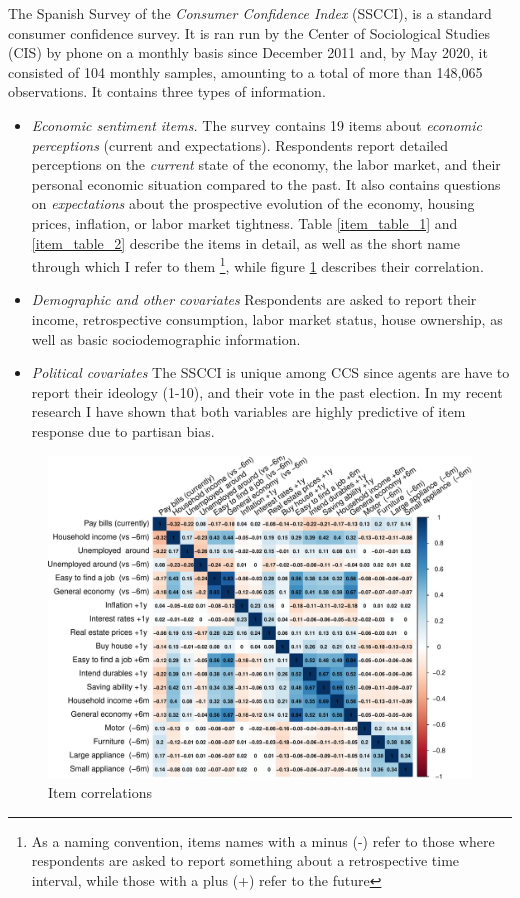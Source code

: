 \documentclass[12pt]{article}
\begin{document}
The Spanish Survey of the \textit{Consumer Confidence Index} (SSCCI), is a standard consumer confidence survey. It is ran  run by the Center of Sociological Studies (CIS) by phone on a monthly basis since December 2011 and, by May 2020, it consisted of 104 monthly samples, amounting to a total of more than 148,065 observations. It contains three types of information.


\begin{itemize}
\item \emph{Economic sentiment items. } The survey contains 19 items about \textit{economic perceptions} (current and expectations). Respondents report detailed perceptions on the \textit{current} state of the economy, the labor market, and their personal economic situation compared to the past. It also contains questions on \textit{expectations} about the prospective evolution of the economy, housing prices, inflation, or labor market tightness. Table \ref{item_table_1} and \ref{item_table_2} describe the items in detail,  as well as the short name through which I refer to them \footnote{As a naming convention, items names with a minus (-) refer to those where respondents are asked to report something about a retrospective time interval, while those with a plus (+) refer to the future}, while figure \ref{icc_item_correlation} describes their correlation.
\item \emph{Demographic and other covariates} Respondents are asked to report  their income, retrospective consumption, labor market status, house ownership, as well as basic sociodemographic information. 
\item \emph{Political covariates} The SSCCI is unique among CCS since agents are have to report their ideology (1-10), and their vote in the past election. In my recent research I have shown that both variables are highly predictive of item response due to partisan bias. 
\end{itemize}



\begin{figure}
	\caption{Item correlations}
	\label{icc_item_correlation}
	\centering
	\includegraphics[width = 425pt]{icc_item_correlation.pdf}
\end{figure}
\end{document}
